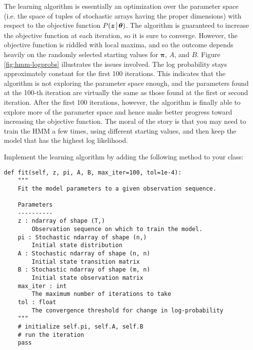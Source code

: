 The learning algorithm is essentially an optimization over the parameter space (i.e. the space of tuples of
stochastic arrays having the proper dimensions) with respect to the objective function $P(\boldsymbol z \!\mathrel{\big|}\! \boldsymbol\theta)$.
The algorithm is guaranteed to increase the objective function at each iteration, so it is sure to converge.
However, the objective function is riddled with local maxima, and so the outcome depends heavily on the randomly
selected starting values for $\boldsymbol\pi$, $A$, and $B$. Figure \ref{fig:hmm-logprobs} illustrates the issues involved.
The log probability stays approximately constant for the first 100
iterations. This indicates that the algorithm is not exploring the parameter space enough, and the parameters
found at the 100-th iteration are virtually the same as those found at the first or second iteration. After the first
100 iterations, however, the algorithm is finally able to explore more of the parameter space and hence make
better progress toward increasing the objective function. The moral of the story is that you may need to train
the HMM a few times, using different starting values, and then keep the model that has the highest log likelihood.

\newpage
\begin{problem}
Implement the learning algorithm by adding the following method to your class:
\begin{lstlisting}
def fit(self, z, pi, A, B, max_iter=100, tol=1e-4):
    """
    Fit the model parameters to a given observation sequence.

    Parameters
    ----------
    z : ndarray of shape (T,)
        Observation sequence on which to train the model.
    pi : Stochastic ndarray of shape (n,)
        Initial state distribution
    A : Stochastic ndarray of shape (n, n)
        Initial state transition matrix
    B : Stochastic ndarray of shape (m, n)
        Initial state observation matrix
    max_iter : int
        The maximum number of iterations to take
    tol : float
        The convergence threshold for change in log-probability
    """
    # initialize self.pi, self.A, self.B
    # run the iteration
    pass
\end{lstlisting}
\end{problem}

